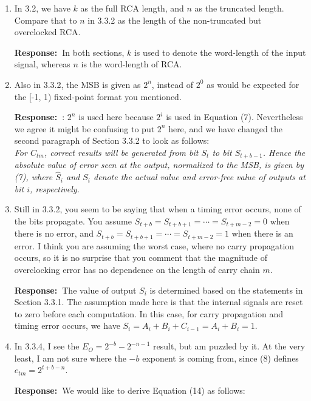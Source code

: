 \documentclass[a4paper, 11pt]{article}
\def\Response{\noindent \textbf{Response:~}}
\newcommand{\Question}[1]{\textcolor[rgb]{0.51,0.00,0.00}{#1}}
\newcommand{\PaperText}[1]{\emph{#1}}
\begin{document}
\begin{enumerate}
  \item \Question{In 3.2, we have $k$ as the full RCA length, and $n$ as the truncated length.  Compare that to $n$ in 3.3.2 as the length of the non-truncated but overclocked RCA.}
      
      \Response In both sections, $k$ is used to denote the word-length of the input signal, whereas $n$ is the word-length of RCA.
      
  \item \Question{Also in 3.3.2, the MSB is given as $2^n$, instead of $2^0$ as would be expected for the [-1, 1) fixed-point format you mentioned.}
      
      \Response : $2^n$ is used here because $2^i$ is used in Equation (7). Nevertheless we agree it might be confusing to put $2^n$ here, and we have changed the second paragraph of Section 3.3.2 to look as follows:\\
      
      \PaperText{For $C_{tm}$, correct results will be generated from bit $S_t$ to bit $S_{t+b-1}$. Hence the absolute value of error seen at the output, normalized to the MSB, is given by (7), where $\hat{S}_i$ and $S_i$ denote the actual value and error-free value of outputs at bit $i$, respectively.}\\
      
  \item \Question{Still in 3.3.2, you seem to be saying that when a timing error occurs, none of the bits propagate. You assume $S_{t+b}=S_{t+b+1}=\cdots=S_{t+m-2}=0$ when there is no error, and $S_{t+b}=S_{t+b+1}=\cdots=S_{t+m-2}=1$ when there is an error. I think you are assuming the worst case, where no carry propagation occurs, so it is no surprise that you comment that the magnitude of overclocking error has no dependence on the length of carry chain $m$.}
      
      \Response The value of output $S_i$ is determined based on the statements in Section 3.3.1. The assumption made here is that the internal signals are reset to zero before each computation. In this case, for carry propagation and timing error occurs, we have $S_i=A_i+B_i+C_{i-1}=A_i+B_i=1$. 
      
  \item \Question{In 3.3.4, I see the $E_O = 2^{-b}-2^{-n-1}$ result, but am puzzled by it.  At the very least, I am not sure where the $-b$ exponent is coming from, since (8) defines $e_{tm} = 2^{t+b-n}$.}
      
      \Response We would like to derive Equation (14) as follows:
      

\end{enumerate}
\end{document}
